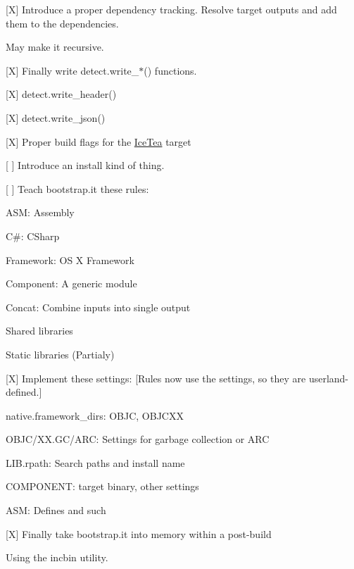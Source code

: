 \begin{DoxyItemize}
\item \mbox{[}X\mbox{]} Introduce a proper dependency tracking. Resolve target outputs and add them to the dependencies.
\begin{DoxyItemize}
\item May make it recursive.
\end{DoxyItemize}
\item \mbox{[}X\mbox{]} Finally write {\ttfamily detect.\+write\+\_\+$\ast$()} functions.
\begin{DoxyItemize}
\item \mbox{[}X\mbox{]} {\ttfamily detect.\+write\+\_\+header()}
\item \mbox{[}X\mbox{]} {\ttfamily detect.\+write\+\_\+json()}
\end{DoxyItemize}
\item \mbox{[}X\mbox{]} Proper build flags for the {\ttfamily \hyperlink{class_ice_tea}{Ice\+Tea}} target
\item \mbox{[} \mbox{]} Introduce an {\ttfamily install} kind of thing.
\item \mbox{[} \mbox{]} Teach {\ttfamily bootstrap.\+it} these rules\+:
\begin{DoxyItemize}
\item A\+SM\+: Assembly
\item C\#\+: C\+Sharp
\item Framework\+: OS X Framework
\item Component\+: A generic module
\item Concat\+: Combine inputs into single output
\item Shared libraries
\item Static libraries (Partialy)
\end{DoxyItemize}
\item \mbox{[}X\mbox{]} Implement these settings\+: \mbox{[}Rules now use the settings, so they are userland-\/defined.\mbox{]}
\begin{DoxyItemize}
\item native.\+framework\+\_\+dirs\+: O\+B\+JC, O\+B\+J\+C\+XX
\item O\+B\+J\+C/\+X\+X.\+GC/\+A\+RC\+: Settings for garbage collection or A\+RC
\item L\+I\+B.\+rpath\+: Search paths and install name
\item C\+O\+M\+P\+O\+N\+E\+NT\+: target binary, other settings
\item A\+SM\+: Defines and such
\end{DoxyItemize}
\item \mbox{[}X\mbox{]} Finally take {\ttfamily bootstrap.\+it} into memory within a post-\/build
\begin{DoxyItemize}
\item Using the {\ttfamily incbin} utility.
\end{DoxyItemize}
\end{DoxyItemize}

